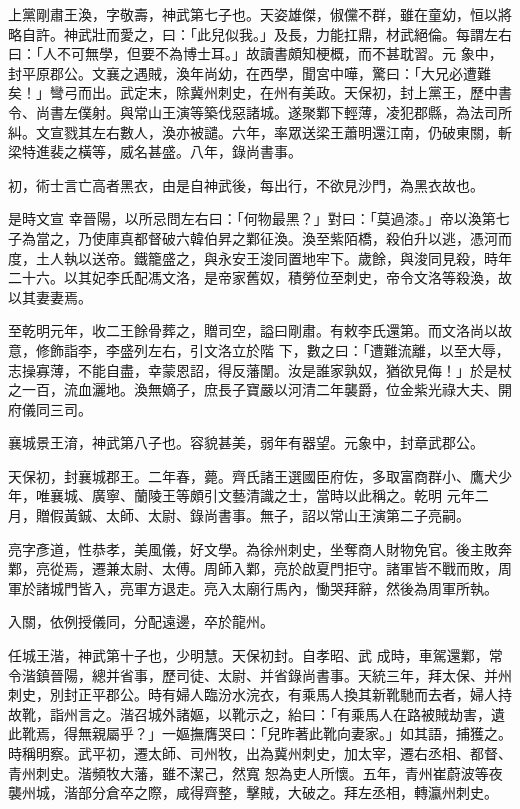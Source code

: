 \begin{pinyinscope}
 上黨剛肅王渙，字敬壽，神武第七子也。天姿雄傑，俶儻不群，雖在童幼，恒以將略自許。神武壯而愛之，曰：「此兒似我。」及長，力能扛鼎，材武絕倫。每謂左右曰：「人不可無學，但要不為博士耳。」故讀書頗知梗概，而不甚耽習。元
 象中，封平原郡公。文襄之遇賊，渙年尚幼，在西學，聞宮中嘩，驚曰：「大兄必遭難矣！」彎弓而出。武定末，除冀州刺史，在州有美政。天保初，封上黨王，歷中書令、尚書左僕射。與常山王演等築伐惡諸城。遂聚鄴下輕薄，凌犯郡縣，為法司所糾。文宣戮其左右數人，渙亦被譴。六年，率眾送梁王蕭明還江南，仍破東關，斬梁特進裴之橫等，威名甚盛。八年，錄尚書事。



 初，術士言亡高者黑衣，由是自神武後，每出行，不欲見沙門，為黑衣故也。



 是時文宣
 幸晉陽，以所忌問左右曰：「何物最黑？」對曰：「莫過漆。」帝以渙第七子為當之，乃使庫真都督破六韓伯昇之鄴征渙。渙至紫陌橋，殺伯升以逃，憑河而度，土人執以送帝。鐵籠盛之，與永安王浚同置地牢下。歲餘，與浚同見殺，時年二十六。以其妃李氏配馮文洛，是帝家舊奴，積勞位至刺史，帝令文洛等殺渙，故以其妻妻焉。



 至乾明元年，收二王餘骨葬之，贈司空，謚曰剛肅。有敕李氏還第。而文洛尚以故意，修飾詣李，李盛列左右，引文洛立於階
 下，數之曰：「遭難流離，以至大辱，志操寡薄，不能自盡，幸蒙恩詔，得反藩闈。汝是誰家孰奴，猶欲見侮！」於是杖之一百，流血灑地。渙無嫡子，庶長子寶嚴以河清二年襲爵，位金紫光祿大夫、開府儀同三司。



 襄城景王淯，神武第八子也。容貌甚美，弱年有器望。元象中，封章武郡公。



 天保初，封襄城郡王。二年春，薨。齊氏諸王選國臣府佐，多取富商群小、鷹犬少年，唯襄城、廣寧、蘭陵王等頗引文藝清識之士，當時以此稱之。乾明
 元年二月，贈假黃鋮、太師、太尉、錄尚書事。無子，詔以常山王演第二子亮嗣。



 亮字彥道，性恭孝，美風儀，好文學。為徐州刺史，坐奪商人財物免官。後主敗奔鄴，亮從焉，遷兼太尉、太傅。周師入鄴，亮於啟夏門拒守。諸軍皆不戰而敗，周軍於諸城門皆入，亮軍方退走。亮入太廟行馬內，慟哭拜辭，然後為周軍所執。



 入關，依例授儀同，分配遠邊，卒於龍州。



 任城王湝，神武第十子也，少明慧。天保初封。自孝昭、武
 成時，車駕還鄴，常令湝鎮晉陽，總并省事，歷司徒、太尉、并省錄尚書事。天統三年，拜太保、并州刺史，別封正平郡公。時有婦人臨汾水浣衣，有乘馬人換其新靴馳而去者，婦人持故靴，詣州言之。湝召城外諸嫗，以靴示之，紿曰：「有乘馬人在路被賊劫害，遺此靴焉，得無親屬乎？」一嫗撫膺哭曰：「兒昨著此靴向妻家。」如其語，捕獲之。時稱明察。武平初，遷太師、司州牧，出為冀州刺史，加太宰，遷右丞相、都督、青州刺史。湝頻牧大藩，雖不潔己，然寬
 恕為吏人所懷。五年，青州崔蔚波等夜襲州城，湝部分倉卒之際，咸得齊整，擊賊，大破之。拜左丞相，轉瀛州刺史。




\end{pinyinscope}
